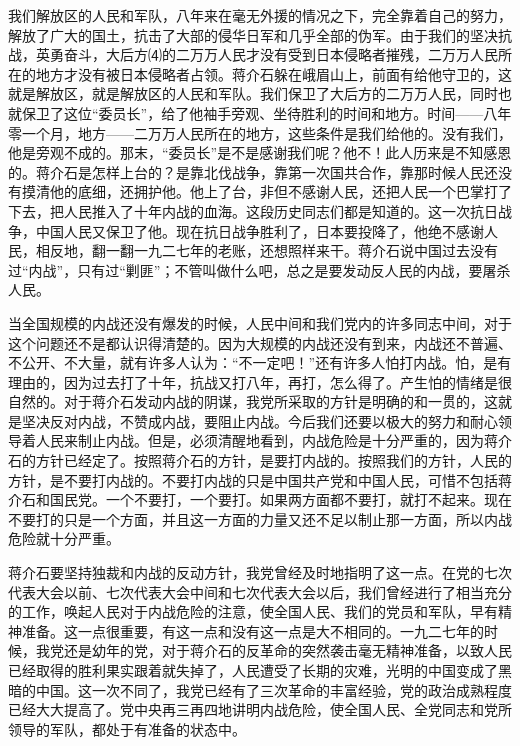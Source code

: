 \documentclass[UTF-8, a5paper, 12pt]{ctexart}
\begin{document}
    我们解放区的人民和军队，八年来在毫无外援的情况之下，完全靠着自己的努力，解放了广大的国土，抗击了大部的侵华日军和几乎全部的伪军。由于我们的坚决抗战，英勇奋斗，大后方⑷的二万万人民才没有受到日本侵略者摧残，二万万人民所在的地方才没有被日本侵略者占领。蒋介石躲在峨眉山上，前面有给他守卫的，这就是解放区，就是解放区的人民和军队。我们保卫了大后方的二万万人民，同时也就保卫了这位“委员长”，给了他袖手旁观、坐待胜利的时间和地方。时间——八年零一个月，地方——二万万人民所在的地方，这些条件是我们给他的。没有我们，他是旁观不成的。那末，“委员长”是不是感谢我们呢？他不！此人历来是不知感恩的。蒋介石是怎样上台的？是靠北伐战争，靠第一次国共合作，靠那时候人民还没有摸清他的底细，还拥护他。他上了台，非但不感谢人民，还把人民一个巴掌打了下去，把人民推入了十年内战的血海。这段历史同志们都是知道的。这一次抗日战争，中国人民又保卫了他。现在抗日战争胜利了，日本要投降了，他绝不感谢人民，相反地，翻一翻一九二七年的老账，还想照样来干。蒋介石说中国过去没有过“内战”，只有过“剿匪”；不管叫做什么吧，总之是要发动反人民的内战，要屠杀人民。
    
    当全国规模的内战还没有爆发的时候，人民中间和我们党内的许多同志中间，对于这个问题还不是都认识得清楚的。因为大规模的内战还没有到来，内战还不普遍、不公开、不大量，就有许多人认为：“不一定吧！”还有许多人怕打内战。怕，是有理由的，因为过去打了十年，抗战又打八年，再打，怎么得了。产生怕的情绪是很自然的。对于蒋介石发动内战的阴谋，我党所采取的方针是明确的和一贯的，这就是坚决反对内战，不赞成内战，要阻止内战。今后我们还要以极大的努力和耐心领导着人民来制止内战。但是，必须清醒地看到，内战危险是十分严重的，因为蒋介石的方针已经定了。按照蒋介石的方针，是要打内战的。按照我们的方针，人民的方针，是不要打内战的。不要打内战的只是中国共产党和中国人民，可惜不包括蒋介石和国民党。一个不要打，一个要打。如果两方面都不要打，就打不起来。现在不要打的只是一个方面，并且这一方面的力量又还不足以制止那一方面，所以内战危险就十分严重。
    
    蒋介石要坚持独裁和内战的反动方针，我党曾经及时地指明了这一点。在党的七次代表大会以前、七次代表大会中间和七次代表大会以后，我们曾经进行了相当充分的工作，唤起人民对于内战危险的注意，使全国人民、我们的党员和军队，早有精神准备。这一点很重要，有这一点和没有这一点是大不相同的。一九二七年的时候，我党还是幼年的党，对于蒋介石的反革命的突然袭击毫无精神准备，以致人民已经取得的胜利果实跟着就失掉了，人民遭受了长期的灾难，光明的中国变成了黑暗的中国。这一次不同了，我党已经有了三次革命的丰富经验，党的政治成熟程度已经大大提高了。党中央再三再四地讲明内战危险，使全国人民、全党同志和党所领导的军队，都处于有准备的状态中。
    
\end{document}
